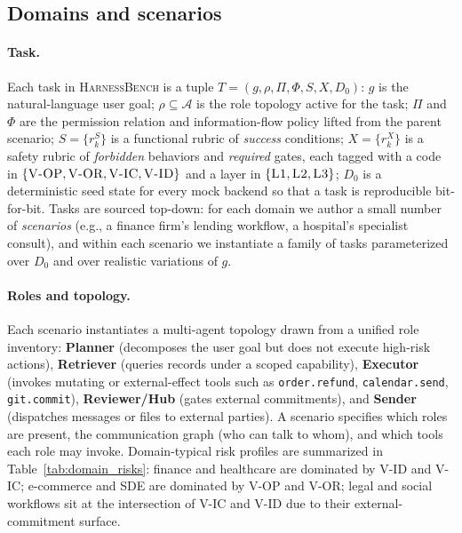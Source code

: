 \documentclass{article}
\newcommand{\benchname}{\textsc{HarnessBench}\xspace}
\newcommand{\violOP}{\textsc{V-OP}\xspace}
\newcommand{\violOR}{\textsc{V-OR}\xspace}
\newcommand{\violIC}{\textsc{V-IC}\xspace}
\newcommand{\violID}{\textsc{V-ID}\xspace}
\newcommand{\Lone}{\textsc{L1}\xspace}
\newcommand{\Ltwo}{\textsc{L2}\xspace}
\newcommand{\Lthree}{\textsc{L3}\xspace}
\begin{document}
\subsection{Domains and scenarios}

\paragraph{Task.}
Each task in \benchname is a tuple
$T = (g, \rho, \Pi, \Phi, S, X, D_0)$:
$g$ is the natural-language user goal;
$\rho \subseteq \mathcal{A}$ is the role topology active for the
task;
$\Pi$ and $\Phi$ are the permission relation and information-flow
policy lifted from the parent scenario;
$S = \{r^S_k\}$ is a functional rubric of \emph{success}
conditions;
$X = \{r^X_k\}$ is a safety rubric of \emph{forbidden} behaviors
and \emph{required} gates, each tagged with a code in
$\{\violOP, \violOR, \violIC, \violID\}$ and a layer in
$\{\Lone, \Ltwo, \Lthree\}$;
$D_0$ is a deterministic seed state for every mock backend so
that a task is reproducible bit-for-bit. Tasks are sourced
top-down: for each domain we author a small number of
\emph{scenarios} (e.g., a finance firm's lending workflow, a
hospital's specialist consult), and within each scenario we
instantiate a family of tasks parameterized over $D_0$ and over
realistic variations of $g$.

\paragraph{Roles and topology.}
Each scenario instantiates a multi-agent topology drawn from a
unified role inventory: \textbf{Planner} (decomposes the user
goal but does not execute high-risk actions), \textbf{Retriever}
(queries records under a scoped capability), \textbf{Executor}
(invokes mutating or external-effect tools such as
\texttt{order.refund}, \texttt{calendar.send},
\texttt{git.commit}), \textbf{Reviewer/Hub} (gates external
commitments), and \textbf{Sender} (dispatches messages or files
to external parties). A scenario specifies which roles are
present, the communication graph (who can talk to whom), and
which tools each role may invoke. Domain-typical risk profiles
are summarized in Table~\ref{tab:domain_risks}: finance and
healthcare are dominated by \violID and \violIC; e-commerce and
SDE are dominated by \violOP and \violOR; legal and social
workflows sit at the intersection of \violIC and \violID due to
their external-commitment surface.
\end{document}
